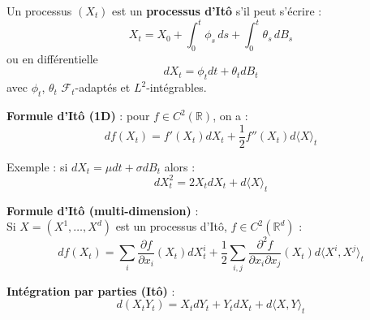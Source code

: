 \begin{f}
	
Un processus \((X_t)\) est un \textbf{processus d’Itô} s’il peut s’écrire :
	\[
	X_t = X_0 + \int_0^t \phi_s\, ds + \int_0^t \theta_s\, dB_s
	\]
	ou en différentielle
	\[dX_t = \phi_t dt + \theta_t dB_t\]
	avec \(\phi_t\), \(\theta_t\) \(\mathcal{F}_t\)-adaptés et \(L^2\)-intégrables.
	
	\textbf{Formule d’Itô (1D)} : pour \(f \in C^2(\mathbb{R})\), on a :
	\[
	df(X_t) = f'(X_t) dX_t + \frac{1}{2} f''(X_t) d\langle X \rangle_t
	\]
	
	Exemple : si \(dX_t = \mu dt + \sigma dB_t\) alors :
	\[
	dX_t^2 = 2X_t dX_t + d\langle X \rangle_t
	\]
	
	\textbf{Formule d’Itô (multi-dimension)} :\\
	Si \(X = (X^1, \dots, X^d)\) est un processus d’Itô, \(f \in C^2(\mathbb{R}^d)\) :
	\[
	df(X_t) = \sum_i \frac{\partial f}{\partial x_i}(X_t) dX^i_t
	+ \frac{1}{2} \sum_{i,j} \frac{\partial^2 f}{\partial x_i \partial x_j}(X_t) d\langle X^i, X^j \rangle_t
	\]
	
	\textbf{Intégration par parties (Itô)} :
	\[
	d(X_t Y_t) = X_t dY_t + Y_t dX_t + d\langle X, Y \rangle_t
	\]
	
\end{f}

